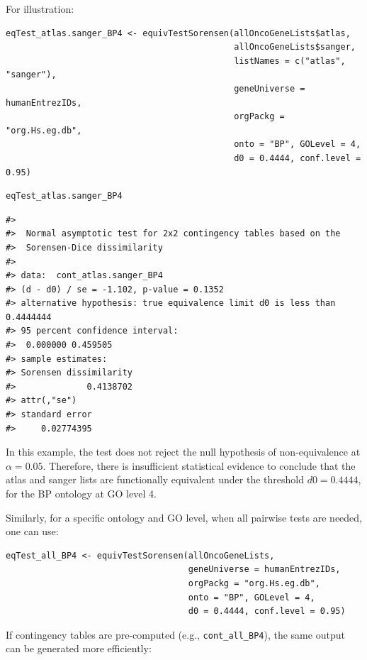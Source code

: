 For illustration:

\begin{verbatim}
eqTest_atlas.sanger_BP4 <- equivTestSorensen(allOncoGeneLists$atlas, 
                                             allOncoGeneLists$sanger,
                                             listNames = c("atlas", "sanger"),
                                             geneUniverse = humanEntrezIDs, 
                                             orgPackg = "org.Hs.eg.db", 
                                             onto = "BP", GOLevel = 4,
                                             d0 = 0.4444, conf.level = 0.95)
\end{verbatim}

\begin{verbatim}
eqTest_atlas.sanger_BP4
\end{verbatim}

\begin{verbatim}
#> 
#>  Normal asymptotic test for 2x2 contingency tables based on the
#>  Sorensen-Dice dissimilarity
#> 
#> data:  cont_atlas.sanger_BP4
#> (d - d0) / se = -1.102, p-value = 0.1352
#> alternative hypothesis: true equivalence limit d0 is less than 0.4444444
#> 95 percent confidence interval:
#>  0.000000 0.459505
#> sample estimates:
#> Sorensen dissimilarity 
#>              0.4138702 
#> attr(,"se")
#> standard error 
#>     0.02774395
\end{verbatim}

In this example, the test does not reject the null hypothesis of non-equivalence at \(\alpha = 0.05\). Therefore, there is insufficient statistical evidence to conclude that the atlas and sanger lists are functionally equivalent under the threshold \(d0 = 0.4444\), for the BP ontology at GO level 4.

Similarly, for a specific ontology and GO level, when all pairwise tests are needed, one can use:

\begin{verbatim}
eqTest_all_BP4 <- equivTestSorensen(allOncoGeneLists,
                                    geneUniverse = humanEntrezIDs, 
                                    orgPackg = "org.Hs.eg.db", 
                                    onto = "BP", GOLevel = 4,
                                    d0 = 0.4444, conf.level = 0.95)
\end{verbatim}

If contingency tables are pre-computed (e.g., \texttt{cont\_all\_BP4}), the same output can be generated more efficiently:

